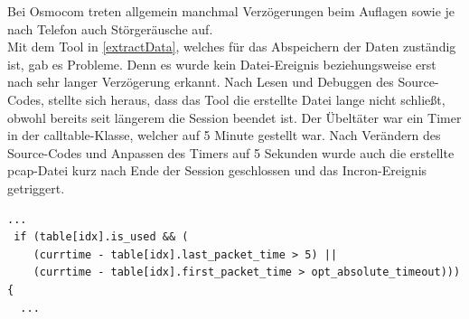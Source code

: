 Bei Osmocom treten allgemein manchmal Verzögerungen beim Auflagen sowie je nach Telefon auch Störgeräusche auf.\\



Mit dem Tool in \ref{extractData}, welches für das Abspeichern der Daten zuständig ist, gab es Probleme. Denn es wurde kein Datei-Ereignis beziehungsweise erst nach sehr langer Verzögerung erkannt. Nach Lesen und Debuggen des Source-Codes, stellte sich heraus, dass das Tool die erstellte Datei lange nicht schließt, obwohl bereits seit längerem die Session beendet ist. Der Übeltäter war ein Timer in der calltable-Klasse, welcher auf 5 Minute gestellt war. Nach Verändern des Source-Codes und Anpassen des Timers auf 5 Sekunden wurde auch die erstellte pcap-Datei kurz nach Ende der Session geschlossen und das Incron-Ereignis getriggert.

\begin{lstlisting}[xleftmargin=.04\textwidth, firstnumber=211]
  ...
 if (table[idx].is_used && (
 	(currtime - table[idx].last_packet_time > 5) ||
    (currtime - table[idx].first_packet_time > opt_absolute_timeout))){
  ...
\end{lstlisting}
